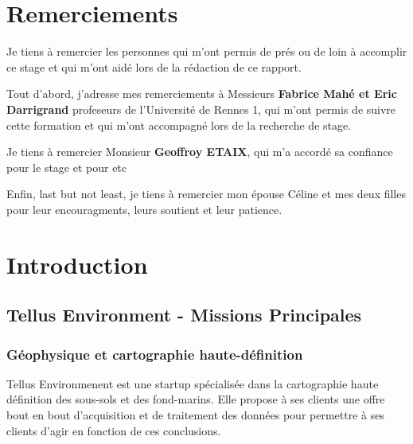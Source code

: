 \documentclass[12pt,a4paper]{report}
\begin{document}
\chapter*{Remerciements}%
\thispagestyle{empty}%


Je tiens à remercier les personnes qui m'ont permis de prés ou de loin à accomplir ce stage et qui m'ont aidé lors de la rédaction de ce rapport.

Tout d'abord, j'adresse mes remerciements à Messieurs \textbf{Fabrice Mahé et Eric Darrigrand} profeseurs de l'Université de Rennes 1, qui m'ont permis de suivre cette formation et qui m'ont accompagné lors de la recherche de stage.

Je tiens à remercier Monsieur \textbf{Geoffroy ETAIX}, qui m'a accordé sa confiance pour le stage et pour etc 

Enfin, last but not least, je tiens à remercier mon épouse Céline et mes deux filles pour leur encouragments, leurs soutient et leur patience.



\setcounter{tocdepth}{5}
\tableofcontents
\newpage

\chapter{Introduction}
	\section{Tellus Environment - Missions Principales}
	
	\subsection{Géophysique et cartographie haute-définition}
	Tellus Environmenent est une startup spécialisée dans la cartographie haute définition des sous-sols et des fond-marins. Elle propose à ses clients une offre bout en bout d'acquisition et de traitement des données pour permettre à ses clients d'agir en fonction de ces conclusions.
	
\end{document}
